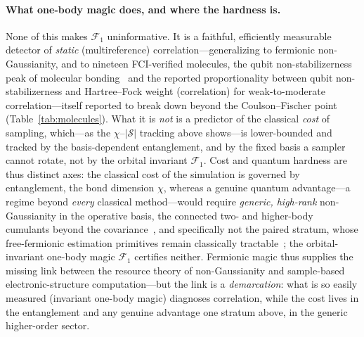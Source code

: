 \paragraph{What one-body magic does, and where the hardness is.} None of this makes $\mathcal F_1$
uninformative. It is a faithful, efficiently measurable detector of \emph{static} (multireference)
correlation---generalizing to fermionic non-Gaussianity, and to nineteen FCI-verified molecules, the
qubit non-stabilizerness peak of molecular bonding~\cite{sarkis2025} and the reported proportionality
between qubit non-stabilizerness and Hartree--Fock weight (correlation) for weak-to-moderate
correlation---itself reported to break down beyond the Coulson--Fischer point~\cite{seibert2026}
(Table~\ref{tab:molecules}). What it is
\emph{not} is a predictor of the classical \emph{cost} of sampling, which---as the $\chi$--$|\mathcal S|$
tracking above shows---is lower-bounded and tracked by the basis-dependent entanglement, and by the fixed basis a sampler
cannot rotate, not by the orbital invariant $\mathcal F_1$. Cost and quantum hardness are thus distinct
axes: the classical cost of the simulation is governed by entanglement, the bond dimension $\chi$,
whereas a genuine quantum advantage---a regime beyond \emph{every} classical method---would require
\emph{generic, high-rank} non-Gaussianity in the operative basis, the connected two- and higher-body
cumulants beyond the covariance~\cite{coffman2025}, and specifically not the paired stratum, whose
free-fermionic estimation primitives remain classically tractable~\cite{oh2026}; the orbital-invariant
one-body magic $\mathcal F_1$ certifies neither. Fermionic magic thus supplies the missing link between the resource theory of non-Gaussianity
and sample-based electronic-structure computation---but the link is a \emph{demarcation}: what is so
easily measured (invariant one-body magic) diagnoses correlation, while the cost lives in the
entanglement and any genuine advantage one stratum above, in the generic higher-order sector.
